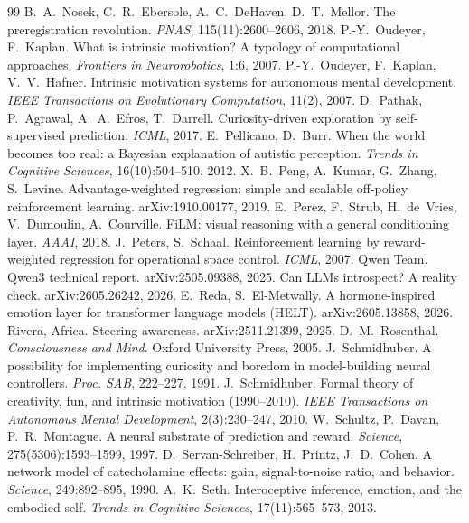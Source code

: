 \documentclass[11pt,a4paper]{article}
\begin{document}
\begin{thebibliography}{99}
 B.~A.~Nosek, C.~R.~Ebersole, A.~C.~DeHaven, D.~T.~Mellor. The preregistration revolution. \emph{PNAS}, 115(11):2600--2606, 2018.
 P.-Y.~Oudeyer, F.~Kaplan. What is intrinsic motivation? A typology of computational approaches. \emph{Frontiers in Neurorobotics}, 1:6, 2007.
 P.-Y.~Oudeyer, F.~Kaplan, V.~V.~Hafner. Intrinsic motivation systems for autonomous mental development. \emph{IEEE Transactions on Evolutionary Computation}, 11(2), 2007.
 D.~Pathak, P.~Agrawal, A.~A.~Efros, T.~Darrell. Curiosity-driven exploration by self-supervised prediction. \emph{ICML}, 2017.
 E.~Pellicano, D.~Burr. When the world becomes \og too real\fg{}: a Bayesian explanation of autistic perception. \emph{Trends in Cognitive Sciences}, 16(10):504--510, 2012.
 X.~B.~Peng, A.~Kumar, G.~Zhang, S.~Levine. Advantage-weighted regression: simple and scalable off-policy reinforcement learning. arXiv:1910.00177, 2019.
 E.~Perez, F.~Strub, H.~de~Vries, V.~Dumoulin, A.~Courville. FiLM: visual reasoning with a general conditioning layer. \emph{AAAI}, 2018.
 J.~Peters, S.~Schaal. Reinforcement learning by reward-weighted regression for operational space control. \emph{ICML}, 2007.
 Qwen Team. Qwen3 technical report. arXiv:2505.09388, 2025.
 Can LLMs introspect? A reality check. arXiv:2605.26242, 2026.
 E.~Reda, S.~El-Metwally. A hormone-inspired emotion layer for transformer language models (HELT). arXiv:2605.13858, 2026.
 Rivera, Africa. Steering awareness. arXiv:2511.21399, 2025.
 D.~M.~Rosenthal. \emph{Consciousness and Mind}. Oxford University Press, 2005.
 J.~Schmidhuber. A possibility for implementing curiosity and boredom in model-building neural controllers. \emph{Proc. SAB}, 222--227, 1991.
 J.~Schmidhuber. Formal theory of creativity, fun, and intrinsic motivation (1990--2010). \emph{IEEE Transactions on Autonomous Mental Development}, 2(3):230--247, 2010.
 W.~Schultz, P.~Dayan, P.~R.~Montague. A neural substrate of prediction and reward. \emph{Science}, 275(5306):1593--1599, 1997.
 D.~Servan-Schreiber, H.~Printz, J.~D.~Cohen. A network model of catecholamine effects: gain, signal-to-noise ratio, and behavior. \emph{Science}, 249:892--895, 1990.
 A.~K.~Seth. Interoceptive inference, emotion, and the embodied self. \emph{Trends in Cognitive Sciences}, 17(11):565--573, 2013.

\end{thebibliography}
\end{document}
